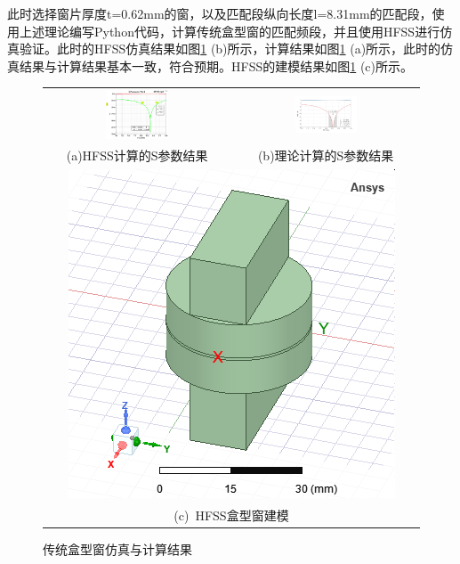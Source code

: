 \documentclass[master]{thesis-uestc}
\begin{document}
此时选择窗片厚度t=0.62mm的窗，以及匹配段纵向长度l=8.31mm的匹配段，使用上述理论编写Python代码，计算传统盒型窗的匹配频段，并且使用HFSS进行仿真验证。此时的HFSS仿真结果如图\ref{fig:传统盒型窗仿真与计算结果} (b)所示，计算结果如图\ref{fig:传统盒型窗仿真与计算结果} (a)所示，此时的仿真结果与计算结果基本一致，符合预期。HFSS的建模结果如图\ref{fig:传统盒型窗仿真与计算结果} (c)所示。

\begin{figure}[!htbp]
    \small
    \centering
    \begin{tabular}{@{\ }c@{\ }c}
        \includegraphics[width=0.35\textwidth]{pic/chapter2/HFSS仿真结果.png} & 
        \hspace{5pt}
        \includegraphics[width=0.35\textwidth]{pic/chapter2/理论计算结果.png}     \\
        \mbox{\small (a)HFSS计算的S参数结果}                                                                               & 
        \mbox{\small (b)理论计算的S参数结果}                                                                                  \\[6bp]
        \multicolumn{2}{c}{\includegraphics[scale=0.2]{pic/chapter2/HFSS盒型窗建模.png}} \\  %
        \multicolumn{2}{c}{\mbox{\small (c) HFSS盒型窗建模}}
    \end{tabular}
    \caption{传统盒型窗仿真与计算结果}
    \label{fig:传统盒型窗仿真与计算结果}
\end{figure}
\end{document}
